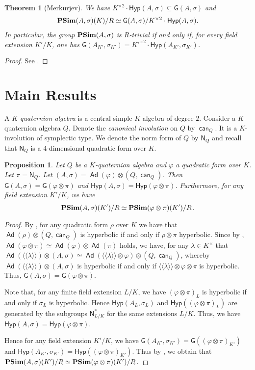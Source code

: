 \documentclass[twoside,11pt]{amsart}
\numberwithin{equation}{section}
\newtheorem{thm}[equation]{Theorem}
\newtheorem{prop}[equation]{Proposition}
\theoremstyle{definition}
\newcommand\N{\operatorname{N}}
\newcommand{\can}{\operatorname{\mathsf{can}}}
\newcommand{\vf}{\varphi}
\newcommand{\mg}[1]{{#1}^{\times}}
\newcommand{\sq}[1]{{#1}^{\times 2}}
\newcommand{\s}{\sigma}
\newcommand{\la}{\langle}
\newcommand{\ra}{\rangle}
\newcommand{\lla}{\la\!\la}
\newcommand{\rra}{\ra\!\ra}
\newcommand\Ad{\operatorname{\mathsf{Ad}}}
\renewcommand{\N}{\mathsf{N}}
\newcommand{\G}{\mathsf{G}}
\newcommand{\Hyp}{\mathsf{Hyp}}
\begin{document}
\begin{thm}[Merkurjev]\label{mer}
We have  $\sq{K}\cdot\Hyp(A,\s)\subseteq \G(A,\s)$ and 
$$ 
{\bf PSim} (A,\s)(K)/R \simeq  
\G(A,\s)/ \sq{K}\cdot\Hyp(A,\s) .  
$$ In particular, the group ${\bf PSim} (A,\s)$ is $R$-trivial if and only if,  for every field extension $K'/K$, one has $\G(A_{K'},\s_{K'})=\sq{K'}\cdot\Hyp(A_{K'},\s_{K'})$.
\end{thm} 
\begin{proof}
    See \cite[Theorem $1$]{Mer96}.
\end{proof}



\section{Main Results}

A \emph{$K$-quaternion algebra} is a central simple $K$-algebra of degree $2$. Consider a $K$-quaternion algebra $Q$. Denote the {\it canonical involution} on $Q$ by $\can_Q$. It is a $K$-involution of symplectic type. We denote the norm form of $Q$ by $\N_Q$ and recall that $\N_Q$ is a $4$-dimensional quadratic form over $K$. 


\begin{prop}\label{initial}
Let $Q$ be a $K$-quaternion  algebra and $\vf$ a quadratic form over $K$. Let $\pi=\N_Q$.
Let  $(A,\s)= \Ad(\vf)\otimes (Q,\can_Q)$. Then $\G(A,\s)=\G(\vf\otimes \pi)$ and $\Hyp(A,\s)=\Hyp(\vf\otimes \pi)$. Furthermore, for any field extension $K'/K$, we have $${\bf PSim}(A,\s)(K')/R\simeq {\bf PSim}(\vf\otimes\pi)(K')/R\,.$$
\end{prop}
\begin{proof}
 By \cite[Theorem 4.6]{BU18}, for any quadratic form $\rho$ over $K$ we have that  $\Ad(\rho)\otimes (Q,\can_Q)$ is hyperbolic if and only if $\rho\otimes \pi$ hyperbolic. Since by \cite[Proposition 3.2]{BU18}, $\Ad(  \vf\otimes \pi )\simeq \Ad( \vf )\otimes \Ad( \pi )$ holds, we have, for any $\lambda\in \mg{K}$ that $\Ad(\lla \lambda\rra )\otimes (A,\s)\simeq \Ad(\lla \lambda \rra \otimes \vf)\otimes (Q,\can_Q)$, whereby $\Ad(\lla \lambda \rra)\otimes (A,\s)$ is hyperbolic if and only if $\lla \lambda \rra \otimes \vf\otimes \pi$ is hyperbolic. Thus, $\G(A,\s)=\G(\vf\otimes \pi)$.

     Note that, for any finite field extension $L/K$,  we have $(\vf\otimes \pi)_L$ is hyperbolic if and only if $\s_L$ is hyperbolic. Hence $\Hyp(A_L,\s_L)$ and $ \Hyp((\vf\otimes \pi)_L)$ are generated by the subgroups $\N_{L/K}^*$ for the same extensions $L/K$. Thus, we have $\Hyp(A,\s)=\Hyp(\vf\otimes \pi)$.

     Hence for any field extension $K'/K$,  we have $\G(A_{K'},\s_{K'})=\G((\vf\otimes \pi)_{K'})$ and $\Hyp(A_{K'},\s_{K'})=\Hyp((\vf\otimes \pi)_{K'})$. Thus by , we obtain that ${\bf PSim}(A,\s)(K')/R\simeq {\bf PSim}(\vf\otimes\pi)(K')/R\,.$
\end{proof}
\end{document}
